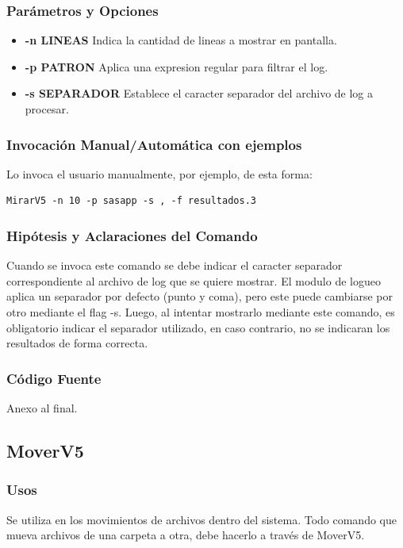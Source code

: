 \documentclass[a4paper,10pt,titlepage]{article}
\begin{document}
		\subsubsection{Par\'ametros y Opciones}
			\begin {itemize}
				\item \textbf{-n LINEAS} {Indica la cantidad de lineas a mostrar en pantalla.}
				\item \textbf{-p PATRON} {Aplica una expresion regular para filtrar el log.}
				\item \textbf{-s SEPARADOR} {Establece el caracter separador del archivo de log a procesar.}
			\end{itemize}
	
		\subsubsection{Invocaci\'on Manual/Autom\'atica con ejemplos}

Lo invoca el usuario manualmente, por ejemplo, de esta forma:

\begin{verbatim}
MirarV5 -n 10 -p sasapp -s , -f resultados.3
\end{verbatim}

		\subsubsection{Hip\'otesis y Aclaraciones del Comando}

Cuando se invoca este comando se debe indicar el caracter separador correspondiente al archivo de log que se quiere mostrar. El modulo de logueo aplica un separador por defecto (punto y coma), pero este puede cambiarse por otro mediante el flag -s. Luego, al intentar mostrarlo mediante este comando, es obligatorio indicar el separador utilizado, en caso contrario, no se indicaran los resultados de forma correcta.


		\subsubsection{C\'odigo Fuente}
			Anexo al final.


	\subsection{MoverV5}
		\subsubsection{Usos}
			Se utiliza en los movimientos de archivos dentro del sistema. Todo comando que mueva archivos de una carpeta a otra, debe hacerlo a trav\'es de MoverV5.
\end{document}
